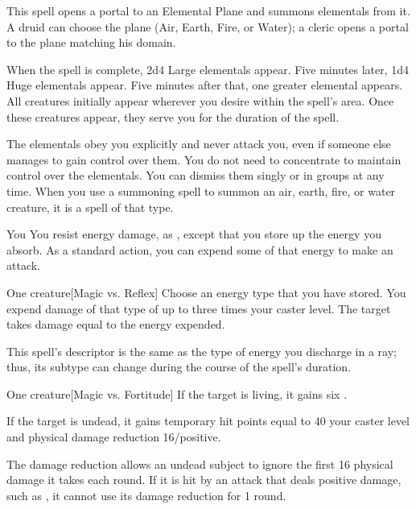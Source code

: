 \spelldur{\durlong \dismissable}
\spellline
\spelleffect This spell opens a portal to an Elemental Plane and summons elementals from it. A druid can choose the plane (Air, Earth, Fire, or Water); a cleric opens a portal to the plane matching his domain.
\par When the spell is complete, 2d4 Large elementals appear. Five minutes later, 1d4 Huge elementals appear. Five minutes after that, one greater elemental appears. All creatures initially appear wherever you desire within the spell's area. Once these creatures appear, they serve you for the duration of the spell.
\par The elementals obey you explicitly and never attack you, even if someone else manages to gain control over them. You do not need to concentrate to maintain control over the elementals. You can dismiss them singly or in groups at any time.
\spellnotes When you use a summoning spell to summon an air, earth, fire, or water creature, it is a spell of that type.

\begin{spelltarget}{You}
    \spelleffect You resist energy damage, as , except that you store up the energy you absorb. As a standard action, you can expend some of that energy to make an attack.
\end{spelltarget}
\spellrng{\rngclose}
\begin{spelltarget}{One creature}[Magic vs. Reflex]
    \spelleffect Choose an energy type that you have stored. You expend damage of that type of up to three times your caster level.
    \spellsuccess The target takes damage equal to the energy expended.
\end{spelltarget}
\spellnotes This spell's descriptor is the same as the type of energy you discharge in a ray; thus, its subtype can change during the course of the spell's duration.

\spellrng{\rngclose}
\spelldur{\durshort}
\begin{spelltarget}{One creature}[Magic vs. Fortitude]
    \spelleffect If the target is living, it gains six \negativelevels.

    \spelleffect If the target is undead, it gains temporary hit points equal to 40 \add your caster level and physical damage reduction 16/positive.
\end{spelltarget}
\spellnotes The damage reduction allows an undead subject to ignore the first 16 physical damage it takes each round. If it is hit by an attack that deals positive damage, such as , it cannot use its damage reduction for 1 round.

